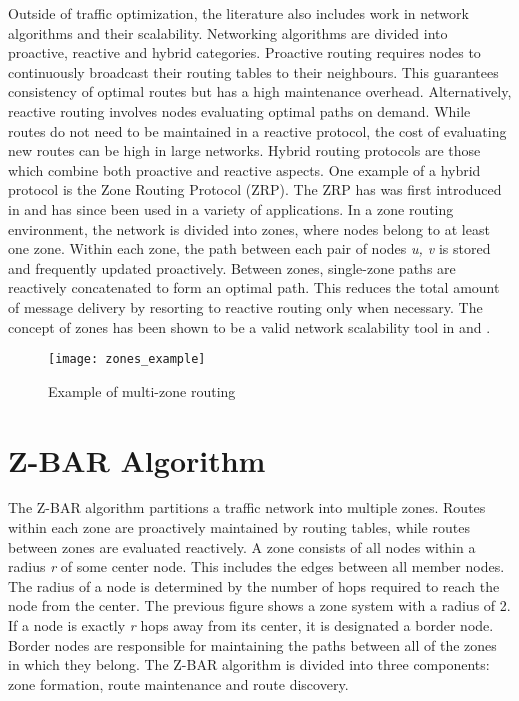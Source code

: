 \documentclass[12pt,conference]{IEEEtran}
\begin{document}
Outside of traffic optimization, the literature also includes work in network algorithms and their scalability. Networking algorithms are divided into proactive, reactive and hybrid categories. Proactive routing requires nodes to continuously broadcast their routing tables to their neighbours. This guarantees consistency of optimal routes but has a high maintenance overhead. Alternatively, reactive routing involves nodes evaluating optimal paths on demand. While routes do not need to be maintained in a reactive protocol, the cost of evaluating new routes can be high in large networks. Hybrid routing protocols are those which combine both proactive and reactive aspects. One example of a hybrid protocol is the Zone Routing Protocol (ZRP). The ZRP has was first introduced in \cite{zrp} and has since been used in a variety of applications. In a zone routing environment, the network is divided into zones, where nodes belong to at least one zone. Within each zone, the path between each pair of nodes \textit{u, v} is stored and frequently updated proactively. Between zones, single-zone paths are reactively concatenated to form an optimal path. This reduces the total amount of message delivery by resorting to reactive routing only when necessary. The concept of zones has been shown to be a valid network scalability tool in \cite{hopnet} and \cite{mazacornet}.

\begin{figure}[h]
\caption{Example of multi-zone routing}
\centering
\texttt{[image: zones\_example]}
\end{figure}

\section{Z-BAR Algorithm}

The Z-BAR algorithm partitions a traffic network into multiple zones. Routes within each zone are proactively maintained by routing tables, while routes between zones are evaluated reactively. A zone consists of all nodes within a radius \textit{r} of some center node. This includes the edges between all member nodes. The radius of a node is determined by the number of hops required to reach the node from the center. The previous figure shows a zone system with a radius of 2. If a node is exactly \textit{r} hops away from its center, it is designated a border node. Border nodes are responsible for maintaining the paths between all of the zones in which they belong. The Z-BAR algorithm is divided into three components: zone formation, route maintenance and route discovery.
\end{document}

